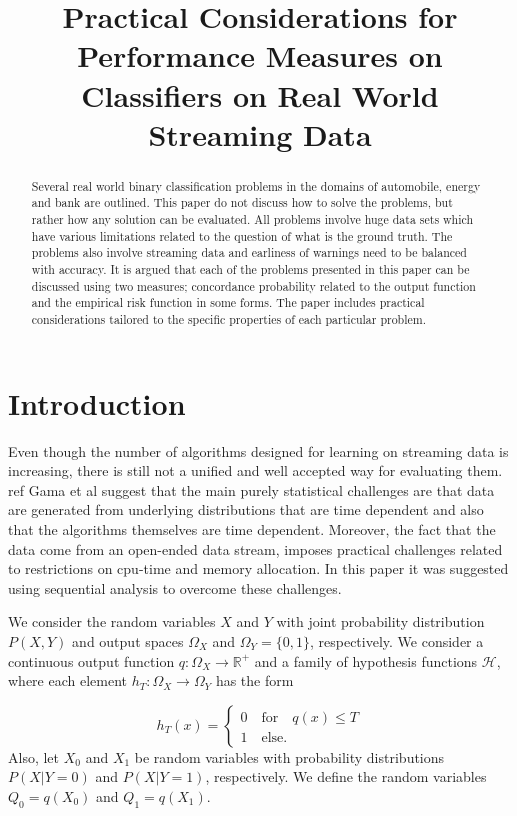 \documentclass{article}
\title{Practical Considerations for Performance Measures on Classifiers on Real World Streaming Data}
\date{}
\theoremstyle{theorem}
\theoremstyle{definition}
\begin{document}
\maketitle

\begin{abstract}
Several real world binary classification problems in the domains of automobile, energy and bank are outlined.  This paper do not discuss how to solve the problems, but rather how any solution can be evaluated.  All problems involve huge data sets which have various limitations related to the question of what is the ground truth. The problems also involve streaming data and earliness of warnings need to be balanced with accuracy.  It is argued that each of the problems presented in this paper can be discussed using two measures; concordance probability related to the output function and the empirical risk function in some forms.  The paper includes practical considerations tailored to the specific properties of each particular problem.
\end{abstract}

\section{Introduction}

Even though the number of algorithms designed for learning on streaming data is increasing, there is still not a unified and well accepted way for evaluating them.  ref Gama et al suggest that the main purely statistical challenges are that data are generated from underlying distributions that are time dependent and also that the algorithms themselves are time dependent.  Moreover, the fact that the data come from an open-ended data stream, imposes practical challenges related to restrictions on cpu-time and memory allocation.  In this paper it was suggested using sequential analysis to overcome these challenges.   





We consider the random variables $X$ and $Y$ with joint probability distribution $P(X,Y)$ and output spaces $\Omega_X$ and $\Omega_Y = \{0,1\}$, respectively.  We consider a continuous output function $q: \Omega_X \rightarrow \mathbb{R}^+$ and a family of hypothesis functions $\mathcal{H}$, where each element $h_T:\Omega_X \rightarrow \Omega_Y$ has the form 

\begin{equation}
\label{eq:ht}
h_T(x) = 
\begin{cases}
0 \quad \mbox{for} \quad q(x) \leq T\\
1 \quad \mbox{else}.
\end{cases}
\end{equation}
Also, let $X_0$ and $X_1$ be random variables with probability distributions $P(X | Y = 0)$ and $P(X | Y = 1)$, respectively.  We define the random variables $Q_0 = q(X_0)$ and $Q_1 = q(X_1)$.
\end{document}
